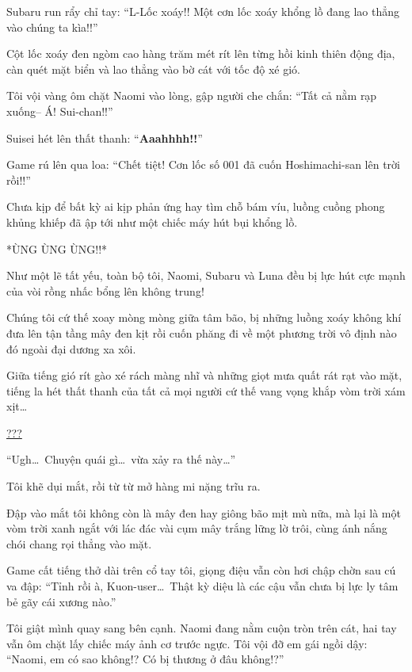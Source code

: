 \documentclass[../main.tex]{subfiles}
\begin{document}
Subaru run rẩy chỉ tay: ``L-Lốc xoáy!! Một cơn lốc xoáy khổng lồ đang lao thẳng vào chúng ta kìa!!''

Cột lốc xoáy đen ngòm cao hàng trăm mét rít lên từng hồi kinh thiên động địa, càn quét mặt biển và lao thẳng vào bờ cát với tốc độ xé gió.

Tôi vội vàng ôm chặt Naomi vào lòng, gập người che chắn: ``Tất cả nằm rạp xuống-- Á! Sui-chan!!''

Suisei hét lên thất thanh: ``\textbf{Aaahhhh!!}''

Game rú lên qua loa: ``Chết tiệt! Cơn lốc số 001 đã cuốn Hoshimachi-san lên trời rồi!!''

Chưa kịp để bất kỳ ai kịp phản ứng hay tìm chỗ bám víu, luồng cuồng phong khủng khiếp đã ập tới như một chiếc máy hút bụi khổng lồ.

*ÙNG ÙNG ÙNG!!*

Như một lẽ tất yếu, toàn bộ tôi, Naomi, Subaru và Luna đều bị lực hút cực mạnh của vòi rồng nhấc bổng lên không trung!

Chúng tôi cứ thế xoay mòng mòng giữa tâm bão, bị những luồng xoáy không khí đưa lên tận tầng mây đen kịt rồi cuốn phăng đi về một phương trời vô định nào đó ngoài đại dương xa xôi.

Giữa tiếng gió rít gào xé rách màng nhĩ và những giọt mưa quất rát rạt vào mặt, tiếng la hét thất thanh của tất cả mọi người cứ thế vang vọng khắp vòm trời xám xịt\dots

\ct

\begin{center}
  \uline{???}
\end{center}

``Ugh\dots\ Chuyện quái gì\dots\ vừa xảy ra thế này\dots''

Tôi khẽ dụi mắt, rồi từ từ mở hàng mi nặng trĩu ra.

Đập vào mắt tôi không còn là mây đen hay giông bão mịt mù nữa, mà lại là một vòm trời xanh ngắt với lác đác vài cụm mây trắng lững lờ trôi, cùng ánh nắng chói chang rọi thẳng vào mặt.

Game cất tiếng thở dài trên cổ tay tôi, giọng điệu vẫn còn hơi chập chờn sau cú va đập: ``Tỉnh rồi à, Kuon-user\dots\ Thật kỳ diệu là các cậu vẫn chưa bị lực ly tâm bẻ gãy cái xương nào.''

Tôi giật mình quay sang bên cạnh. Naomi đang nằm cuộn tròn trên cát, hai tay vẫn ôm chặt lấy chiếc máy ảnh cơ trước ngực. Tôi vội đỡ em gái ngồi dậy: ``Naomi, em có sao không!? Có bị thương ở đâu không!?''
\end{document}
